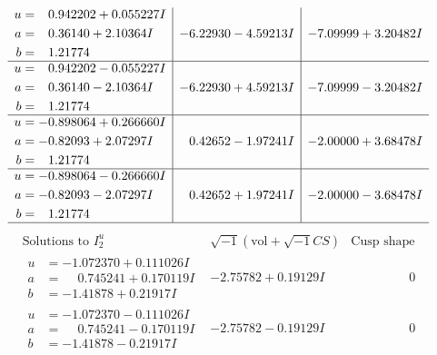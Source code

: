 \documentclass[1p]{elsarticle_modified}
\theoremstyle{definition}
\newcommand{\I}{\sqrt{-1}}
\begin{document}
$$\begin{array}{c|c|c}
\begin{aligned}
u &= \phantom{-}0.942202 + 0.055227 I \\
a &= \phantom{-}0.36140 + 2.10364 I \\
b &= \phantom{-}1.21774\phantom{ +0.000000I}\end{aligned}
 & -6.22930 - 4.59213 I & -7.09999 + 3.20482 I \\ \hline\begin{aligned}
u &= \phantom{-}0.942202 - 0.055227 I \\
a &= \phantom{-}0.36140 - 2.10364 I \\
b &= \phantom{-}1.21774\phantom{ +0.000000I}\end{aligned}
 & -6.22930 + 4.59213 I & -7.09999 - 3.20482 I \\ \hline\begin{aligned}
u &= -0.898064 + 0.266660 I \\
a &= -0.82093 + 2.07297 I \\
b &= \phantom{-}1.21774\phantom{ +0.000000I}\end{aligned}
 & \phantom{-}0.42652 - 1.97241 I & -2.00000 + 3.68478 I \\ \hline\begin{aligned}
u &= -0.898064 - 0.266660 I \\
a &= -0.82093 - 2.07297 I \\
b &= \phantom{-}1.21774\phantom{ +0.000000I}\end{aligned}
 & \phantom{-}0.42652 + 1.97241 I & -2.00000 - 3.68478 I\\
 \hline 
 \end{array}$$\newpage$$\begin{array}{c|c|c}  
\text{Solutions to }I^u_{2}& \I (\text{vol} + \sqrt{-1}CS) & \text{Cusp shape}\\
 \hline 
\begin{aligned}
u &= -1.072370 + 0.111026 I \\
a &= \phantom{-}0.745241 + 0.170119 I \\
b &= -1.41878 + 0.21917 I\end{aligned}
 & -2.75782 + 0.19129 I & \phantom{-0.000000 } 0 \\ \hline\begin{aligned}
u &= -1.072370 - 0.111026 I \\
a &= \phantom{-}0.745241 - 0.170119 I \\
b &= -1.41878 - 0.21917 I\end{aligned}
 & -2.75782 - 0.19129 I & \phantom{-0.000000 } 0 \\ \hline\begin{aligned}

\end{aligned}
\end{array}$$
\end{document}
